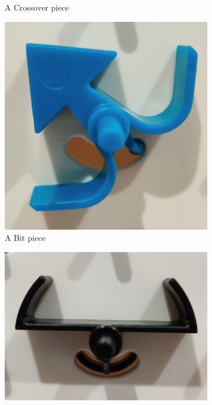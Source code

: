 \documentclass{l4proj}
\begin{document}
\begin{figure}
\begin{subfigure}[b]{0.20\textwidth}
        \caption{A Crossover piece \\}
        \label{fig:phyCrossover}
    \end{subfigure}
    \begin{subfigure}[b]{0.20\textwidth}
        \includegraphics[width=\textwidth]{images/bit.pdf}
        \caption{A Bit piece \\}
        \label{fig:phyBit}
    \end{subfigure}
    \begin{subfigure}[b]{0.20\textwidth}
        \includegraphics[width=\textwidth]{images/interceptor.pdf}

\end{subfigure}
\end{figure}
\end{document}
